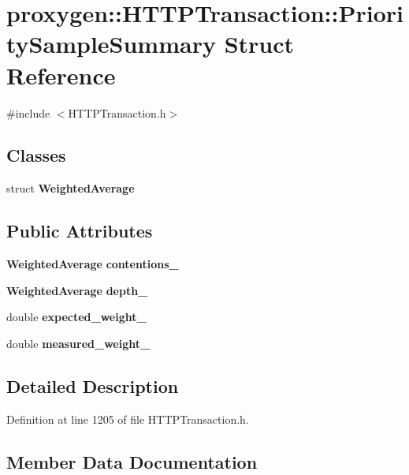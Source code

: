 \section{proxygen\+:\+:H\+T\+T\+P\+Transaction\+:\+:Priority\+Sample\+Summary Struct Reference}
\label{structproxygen_1_1HTTPTransaction_1_1PrioritySampleSummary}


{\ttfamily \#include $<$H\+T\+T\+P\+Transaction.\+h$>$}

\subsection*{Classes}
\begin{DoxyCompactItemize}
\item 
struct {\bf Weighted\+Average}
\end{DoxyCompactItemize}
\subsection*{Public Attributes}
\begin{DoxyCompactItemize}
\item 
{\bf Weighted\+Average} {\bf contentions\+\_\+}
\item 
{\bf Weighted\+Average} {\bf depth\+\_\+}
\item 
double {\bf expected\+\_\+weight\+\_\+}
\item 
double {\bf measured\+\_\+weight\+\_\+}
\end{DoxyCompactItemize}


\subsection{Detailed Description}


Definition at line 1205 of file H\+T\+T\+P\+Transaction.\+h.



\subsection{Member Data Documentation}
